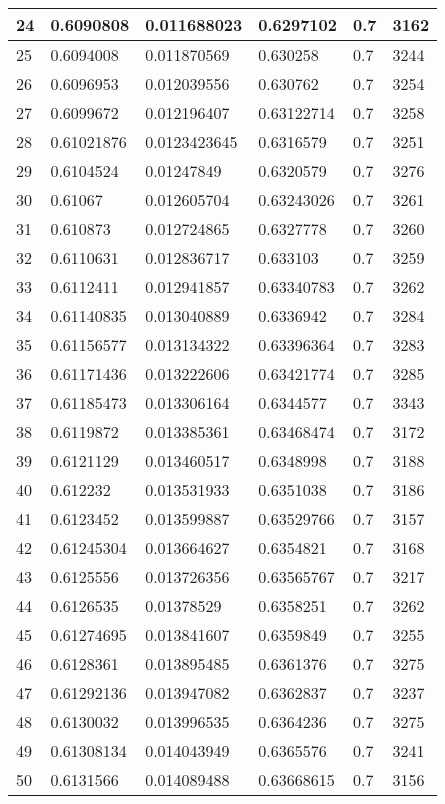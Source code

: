 \begin{longtable}{|l|l|l|l|l|l|}
24 & 0.6090808 & 0.011688023 & 0.6297102 & 0.7 & 3162 \\ \hline 
25 & 0.6094008 & 0.011870569 & 0.630258 & 0.7 & 3244 \\ \hline 
26 & 0.6096953 & 0.012039556 & 0.630762 & 0.7 & 3254 \\ \hline 
27 & 0.6099672 & 0.012196407 & 0.63122714 & 0.7 & 3258 \\ \hline 
28 & 0.61021876 & 0.0123423645 & 0.6316579 & 0.7 & 3251 \\ \hline 
29 & 0.6104524 & 0.01247849 & 0.6320579 & 0.7 & 3276 \\ \hline 
30 & 0.61067 & 0.012605704 & 0.63243026 & 0.7 & 3261 \\ \hline 
31 & 0.610873 & 0.012724865 & 0.6327778 & 0.7 & 3260 \\ \hline 
32 & 0.6110631 & 0.012836717 & 0.633103 & 0.7 & 3259 \\ \hline 
33 & 0.6112411 & 0.012941857 & 0.63340783 & 0.7 & 3262 \\ \hline 
34 & 0.61140835 & 0.013040889 & 0.6336942 & 0.7 & 3284 \\ \hline 
35 & 0.61156577 & 0.013134322 & 0.63396364 & 0.7 & 3283 \\ \hline 
36 & 0.61171436 & 0.013222606 & 0.63421774 & 0.7 & 3285 \\ \hline 
37 & 0.61185473 & 0.013306164 & 0.6344577 & 0.7 & 3343 \\ \hline 
38 & 0.6119872 & 0.013385361 & 0.63468474 & 0.7 & 3172 \\ \hline 
39 & 0.6121129 & 0.013460517 & 0.6348998 & 0.7 & 3188 \\ \hline 
40 & 0.612232 & 0.013531933 & 0.6351038 & 0.7 & 3186 \\ \hline 
41 & 0.6123452 & 0.013599887 & 0.63529766 & 0.7 & 3157 \\ \hline 
42 & 0.61245304 & 0.013664627 & 0.6354821 & 0.7 & 3168 \\ \hline 
43 & 0.6125556 & 0.013726356 & 0.63565767 & 0.7 & 3217 \\ \hline 
44 & 0.6126535 & 0.01378529 & 0.6358251 & 0.7 & 3262 \\ \hline 
45 & 0.61274695 & 0.013841607 & 0.6359849 & 0.7 & 3255 \\ \hline 
46 & 0.6128361 & 0.013895485 & 0.6361376 & 0.7 & 3275 \\ \hline 
47 & 0.61292136 & 0.013947082 & 0.6362837 & 0.7 & 3237 \\ \hline 
48 & 0.6130032 & 0.013996535 & 0.6364236 & 0.7 & 3275 \\ \hline 
49 & 0.61308134 & 0.014043949 & 0.6365576 & 0.7 & 3241 \\ \hline 
50 & 0.6131566 & 0.014089488 & 0.63668615 & 0.7 & 3156 \\ \hline 
\end{longtable}